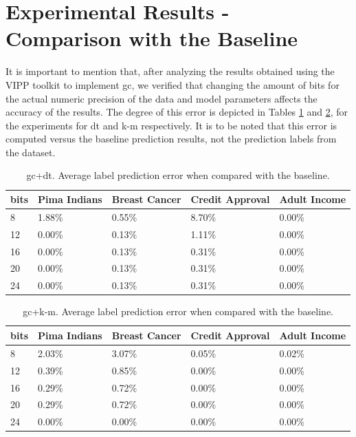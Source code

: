 \section{Experimental Results - Comparison with the Baseline}
\label{sec:ExperimentalResultsComparisonBaseline}


It is important to mention that, after analyzing the results obtained using the VIPP toolkit to implement \ac{gc}, we verified that changing the amount of bits for the actual numeric precision of the data and model parameters affects the accuracy of the results. The degree of this error is depicted in Tables \ref{table:avgErrorDT} and \ref{table:avgErrorKM}, for the experiments for \ac{dt} and \ac{k-m} respectively. It is to be noted that this error is computed versus the baseline prediction results, not the prediction labels from the dataset. 

\begin{table}[htp]
\centering
\caption{\acs{gc}+\acs{dt}. Average label prediction error when compared with the baseline.}
\label{table:avgErrorDT}
\begin{tabular}{|l|l|l|l|l|}
\hline
\textbf{bits} & \textbf{Pima Indians} & \textbf{Breast Cancer} & \textbf{Credit Approval} & \textbf{Adult Income} \\ \hline
8    & 1.88\%       & 0.55\%        & 8.70\%          & 0.00\%       \\ \hline
12   & 0.00\%       & 0.13\%        & 1.11\%          & 0.00\%       \\ \hline
16   & 0.00\%       & 0.13\%        & 0.31\%          & 0.00\%       \\ \hline
20   & 0.00\%       & 0.13\%        & 0.31\%          & 0.00\%       \\ \hline
24   & 0.00\%       & 0.13\%        & 0.31\%          & 0.00\%       \\ \hline
\end{tabular}
\end{table}

\begin{table}[htp]
\centering
\caption{\acs{gc}+\acs{k-m}. Average label prediction error when compared with the baseline.}
\label{table:avgErrorKM}
\begin{tabular}{|l|l|l|l|l|}
\hline
\textbf{bits} & \textbf{Pima Indians} & \textbf{Breast Cancer} & \textbf{Credit Approval} & \textbf{Adult Income} \\ \hline
8    & 2.03\%       & 3.07\%        &    0.05\%       &     0.02\%   \\ \hline
12   & 0.39\%       & 0.85\%        &    0.00\%       &     0.00\%   \\ \hline
16   & 0.29\%       & 0.72\%        &    0.00\%       &     0.00\%   \\ \hline
20   & 0.29\%       & 0.72\%        &    0.00\%       &     0.00\%   \\ \hline
24   & 0.00\%       & 0.00\%        &    0.00\%       &     0.00\%   \\ \hline
\end{tabular}
\end{table}

